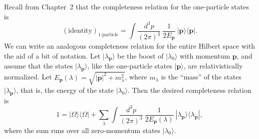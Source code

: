 Recall from Chapter~2 that the completeness relation for the one-particle
states is
\begin{equation}
  (\text{identity})_{\text{1-particle}} = \int
    \frac{d^3p}{(2\pi)^3}\ \frac{1}{2E_{\mathbf{p}}}\ |\mathbf{p}\rangle
    \langle\mathbf{p}| .
  \label{eq:7.1}
\end{equation}
We can write an analogous completeness relation for the entire Hilbert space
with the aid of a bit of notation.  Let $|\lambda_{\mathbf{p}}\rangle$ be the
boost of $|\lambda_0\rangle$ with momentum $\mathbf{p}$, and assume that the
states $|\lambda_{\mathbf{p}}\rangle$, like the one-particle states
$|\mathbf{p}\rangle$, are relativistically normalized.  Let
$E_{\mathbf{p}}(\lambda) = \sqrt{|\mathbf{p}|^2 + m_\lambda^2}$, where
$m_\lambda$ is the ``mass'' of the states $|\lambda_{\mathbf{p}}\rangle$,
that is, the energy of the state $|\lambda_0\rangle$.  Then the desired
completeness relation is
\begin{equation}
  1 = |\Omega\rangle\langle\Omega| + \sum_\lambda \int
    \frac{d^3p}{(2\pi)^3}\ \frac{1}{2E_{\mathbf{p}}(\lambda)}\
    |\lambda_{\mathbf{p}}\rangle\langle\lambda_{\mathbf{p}}|,
  \label{eq:7.2}
\end{equation}
where the sum runs over all zero-momentum states $|\lambda_0\rangle$.

